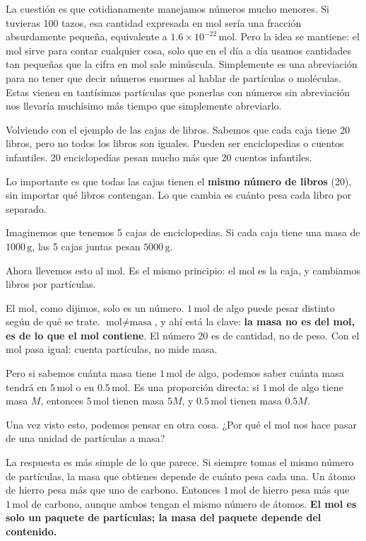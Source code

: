 La cuestión es que cotidianamente manejamos números mucho menores. Si tuvieras 
100 tazos, esa cantidad expresada en mol sería una fracción absurdamente 
pequeña, equivalente a $1.6\times10^{-22}\,\mathrm{mol}$. Pero la idea se mantiene: el mol 
sirve para contar cualquier cosa, solo que en el día a día usamos cantidades 
tan pequeñas que la cifra en mol sale minúscula. Simplemente es una abreviación 
para no tener que decir números enormes al hablar de partículas o moléculas. 
Estas vienen en tantísimas partículas que ponerlas con números sin abreviación 
nos llevaría muchísimo más tiempo que simplemente abreviarlo.

\medskip
Volviendo con el ejemplo de las cajas de libros. Sabemos que cada caja tiene 
20 libros, pero no todos los libros son iguales. Pueden ser enciclopedias o 
cuentos infantiles. 20 enciclopedias pesan mucho más que 20 cuentos infantiles.

Lo importante es que todas las cajas tienen el \textbf{mismo número de libros} 
(20), sin importar qué libros contengan. Lo que cambia es cuánto pesa cada 
libro por separado.

Imaginemos que tenemos 5 cajas de enciclopedias. Si cada caja tiene una masa 
de $1000\,\mathrm{g}$, las 5 cajas juntas pesan $5000\,\mathrm{g}$.

\medskip
Ahora llevemos esto al mol. Es el mismo principio: el mol es la caja, y 
cambiamos libros por partículas.

El mol, como dijimos, solo es un número. $1\,\mathrm{mol}$ de algo puede pesar 
distinto según de qué se trate. $\text{mol} \neq \text{masa}$, y ahí está la 
clave: \textbf{la masa no es del mol, es de lo que el mol contiene}. El número 
20 es de cantidad, no de peso. Con el mol pasa igual: cuenta partículas, no 
mide masa.

Pero si sabemos cuánta masa tiene $1\,\mathrm{mol}$ de algo, podemos saber 
cuánta masa tendrá en $5\,\mathrm{mol}$ o en $0.5\,\mathrm{mol}$. Es una 
proporción directa: si $1\,\mathrm{mol}$ de algo tiene masa $M$, entonces 
$5\,\mathrm{mol}$ tienen masa $5M$, y $0.5\,\mathrm{mol}$ tienen masa $0.5M$.

\medskip
Una vez visto esto, podemos pensar en otra cosa. ¿Por qué el mol nos hace 
pasar de una unidad de partículas a masa?

La respuesta es más simple de lo que parece. Si siempre tomas el mismo número 
de partículas, la masa que obtienes depende de cuánto pesa cada una. Un átomo 
de hierro pesa más que uno de carbono. Entonces $1\,\mathrm{mol}$ de hierro 
pesa más que $1\,\mathrm{mol}$ de carbono, aunque ambos tengan el mismo número 
de átomos. \textbf{El mol es solo un paquete de partículas; la masa del paquete 
depende del contenido.}

